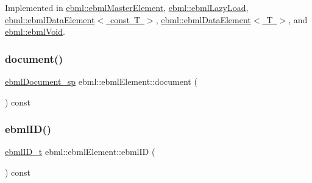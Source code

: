 Implemented in \mbox{\hyperlink{classebml_1_1ebmlMasterElement_ae396f9a2f9e0e86b7f6d20505b88352c}{ebml\+::ebml\+Master\+Element}}, \mbox{\hyperlink{classebml_1_1ebmlLazyLoad_a0a6ad37b1a5db83be3833d28e933ebc7}{ebml\+::ebml\+Lazy\+Load}}, \mbox{\hyperlink{classebml_1_1ebmlDataElement_3_01const_01T_01_4_a0965d2da67f1862d2c806151063dcfce}{ebml\+::ebml\+Data\+Element$<$ const T $>$}}, \mbox{\hyperlink{classebml_1_1ebmlDataElement_add3cc3627008b8139a054a3a0696bc2d}{ebml\+::ebml\+Data\+Element$<$ T $>$}}, and \mbox{\hyperlink{classebml_1_1ebmlVoid_a9801f10eb9f0a5449fa39d8a31dbf315}{ebml\+::ebml\+Void}}.

\mbox{\label{classebml_1_1ebmlElement_a1ee44e2978cd9e23c98cd9c05dd8fa35}} 
\subsubsection{\texorpdfstring{document()}{document()}}
{\footnotesize\ttfamily \mbox{\hyperlink{namespaceebml_a66018942b568da5041136a945148b450}{ebml\+Document\+\_\+sp}} ebml\+::ebml\+Element\+::document (\begin{DoxyParamCaption}{ }\end{DoxyParamCaption}) const}

\mbox{\label{classebml_1_1ebmlElement_afb2aa40757e663892d3a079de0f4e7d6}} 
\subsubsection{\texorpdfstring{ebml\+I\+D()}{ebmlID()}}
{\footnotesize\ttfamily \mbox{\hyperlink{namespaceebml_a86c5f604ddf12a74aa9812e997a58691}{ebml\+I\+D\+\_\+t}} ebml\+::ebml\+Element\+::ebml\+ID (\begin{DoxyParamCaption}{ }\end{DoxyParamCaption}) const}

\mbox{\label{classebml_1_1ebmlElement_aaeddd5ffc1da2f3d4f2a9c9ec1dbed4d}} 
